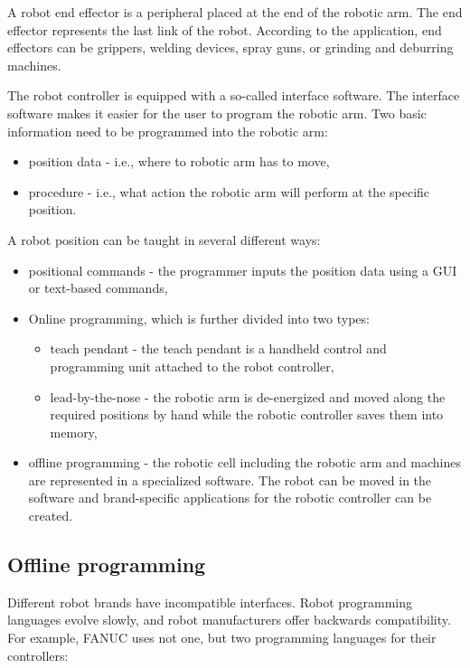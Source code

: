 A robot end effector is a peripheral placed at the end of the robotic arm. The end effector represents the last link of the robot. According to the application, end effectors can be grippers, welding devices, spray guns, or grinding and deburring machines.

The robot controller is equipped with a so-called interface software. The interface software makes it easier for the user to program the robotic arm.  
Two basic information need to be programmed into the robotic arm:

\begin{itemize}
    \item position data - i.e., where to robotic arm has to move,
    \item procedure - i.e., what action the robotic arm will perform at the specific position.
\end{itemize}

A robot position can be taught in several different ways:

\begin{itemize}
    \item positional commands - the programmer inputs the position data using a GUI or text-based commands,
    
    \item Online programming, which is further divided into two types:
    
    \begin{itemize}
    
    \item teach pendant - the teach pendant is a handheld control and programming unit attached to the robot controller,
    \item lead-by-the-nose - the robotic arm is de-energized and moved along the required positions by hand while the robotic controller saves them into memory,
    
    \end{itemize}
    
    \item offline programming - the robotic cell including the robotic arm and machines are represented in a specialized software. The robot can be moved in the software and brand-specific applications for the robotic controller can be created.
  

\end{itemize}

\subsection{Offline programming}
Different robot brands have incompatible interfaces. Robot programming languages evolve slowly, and robot manufacturers offer backwards compatibility. For example, FANUC uses not one, but two programming languages for their controllers: 

